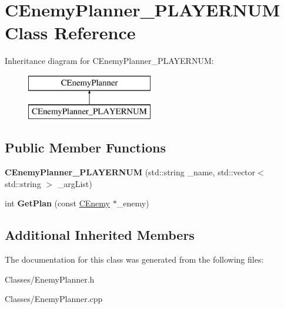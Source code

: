 \hypertarget{class_c_enemy_planner___p_l_a_y_e_r_n_u_m}{}\section{C\+Enemy\+Planner\+\_\+\+P\+L\+A\+Y\+E\+R\+N\+UM Class Reference}
\label{class_c_enemy_planner___p_l_a_y_e_r_n_u_m}
Inheritance diagram for C\+Enemy\+Planner\+\_\+\+P\+L\+A\+Y\+E\+R\+N\+UM\+:\begin{figure}[H]
\begin{center}
\leavevmode
\includegraphics[height=2.000000cm]{class_c_enemy_planner___p_l_a_y_e_r_n_u_m}
\end{center}
\end{figure}
\subsection*{Public Member Functions}
\begin{DoxyCompactItemize}
\item 
{\bfseries C\+Enemy\+Planner\+\_\+\+P\+L\+A\+Y\+E\+R\+N\+UM} (std\+::string \+\_\+name, std\+::vector$<$ std\+::string $>$ \+\_\+arg\+List)\hypertarget{class_c_enemy_planner___p_l_a_y_e_r_n_u_m_a1168d5a04a097ce0747914ce9eaf65e1}{}\label{class_c_enemy_planner___p_l_a_y_e_r_n_u_m_a1168d5a04a097ce0747914ce9eaf65e1}

\item 
int {\bfseries Get\+Plan} (const \hyperlink{class_c_enemy}{C\+Enemy} $\ast$\+\_\+enemy)\hypertarget{class_c_enemy_planner___p_l_a_y_e_r_n_u_m_ae3b0858481479ba5ac8a3e7adec5d5ab}{}\label{class_c_enemy_planner___p_l_a_y_e_r_n_u_m_ae3b0858481479ba5ac8a3e7adec5d5ab}

\end{DoxyCompactItemize}
\subsection*{Additional Inherited Members}


The documentation for this class was generated from the following files\+:\begin{DoxyCompactItemize}
\item 
Classes/Enemy\+Planner.\+h\item 
Classes/Enemy\+Planner.\+cpp\end{DoxyCompactItemize}
